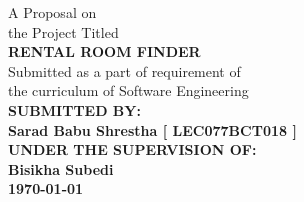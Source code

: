 \begin{center}
{\fontsize{14pt}{20}\selectfont A Proposal on \\ the Project Titled}\\
\vspace{1in}
{\fontsize{14pt}{20}\selectfont \textbf{RENTAL ROOM FINDER }}\\
\vspace{1in}
{\fontsize{14pt}{20}\selectfont
Submitted as a part of requirement of \\the curriculum of
Software Engineering\\}
\vspace{1in}
    {\fontsize{14pt}{20}\selectfont \textbf{\MakeUppercase{Submitted by:}}}\\
    {\fontsize{14pt}{20}\selectfont \textbf{Sarad Babu Shrestha [ LEC077BCT018
    ]}}\\
\vspace{1in}
    {\fontsize{14pt}{20}\selectfont \textbf{\MakeUppercase{under the supervision of:}}}\\
    {\fontsize{14pt}{20}\selectfont \textbf{Bisikha Subedi}}\\
\vspace{1in}
{\fontsize{14pt}{20}\selectfont \textbf{\today}}\\
\end{center}
\thispagestyle{empty}

